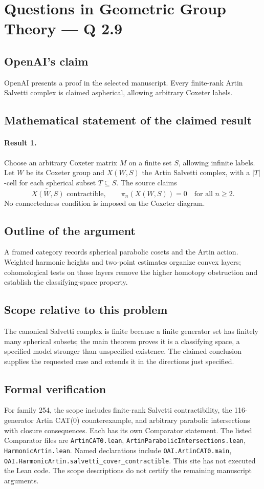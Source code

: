 \documentclass[11pt]{article}
\begin{document}
\section*{Questions in Geometric Group Theory — Q 2.9}

\subsection{OpenAI's claim}
OpenAI presents a proof in the selected manuscript. Every finite-rank Artin Salvetti complex is claimed aspherical, allowing arbitrary Coxeter labels.

\subsection{Mathematical statement of the claimed result}
\paragraph{Result 1.} Choose an arbitrary Coxeter matrix \(M\) on a finite set \(S\), allowing infinite labels. Let \(W\) be its Coxeter group and \(X(W,S)\) the Artin Salvetti complex, with a \(|T|\)-cell for each spherical subset \(T\subseteq S\). The source claims
\[
 \widetilde{X(W,S)}\text{ contractible},\qquad
 \pi_n(X(W,S))=0\quad\text{for all }n\ge2.
\]
No connectedness condition is imposed on the Coxeter diagram.

\subsection{Outline of the argument}
A framed category records spherical parabolic cosets and the Artin action. Weighted harmonic heights and two-point estimates organize convex layers; cohomological tests on those layers remove the higher homotopy obstruction and establish the classifying-space property.

\subsection{Scope relative to this problem}
The canonical Salvetti complex is finite because a finite generator set has finitely many spherical subsets; the main theorem proves it is a classifying space, a specified model stronger than unspecified existence. The claimed conclusion supplies the requested case and extends it in the directions just specified.

\subsection{Formal verification}
For family 254, the scope includes finite-rank Salvetti contractibility, the 116-generator Artin CAT(0) counterexample, and arbitrary parabolic intersections with closure consequences. Each has its own Comparator statement. The listed Comparator files are \texttt{ArtinCAT0.lean}, \texttt{ArtinParabolicIntersections.lean}, \texttt{HarmonicArtin.lean}. Named declarations include \texttt{OAI.ArtinCAT0.main}, \texttt{OAI.HarmonicArtin.salvetti\_cover\_contractible}. This site has not executed the Lean code. The scope descriptions do not certify the remaining manuscript arguments.
\end{document}
